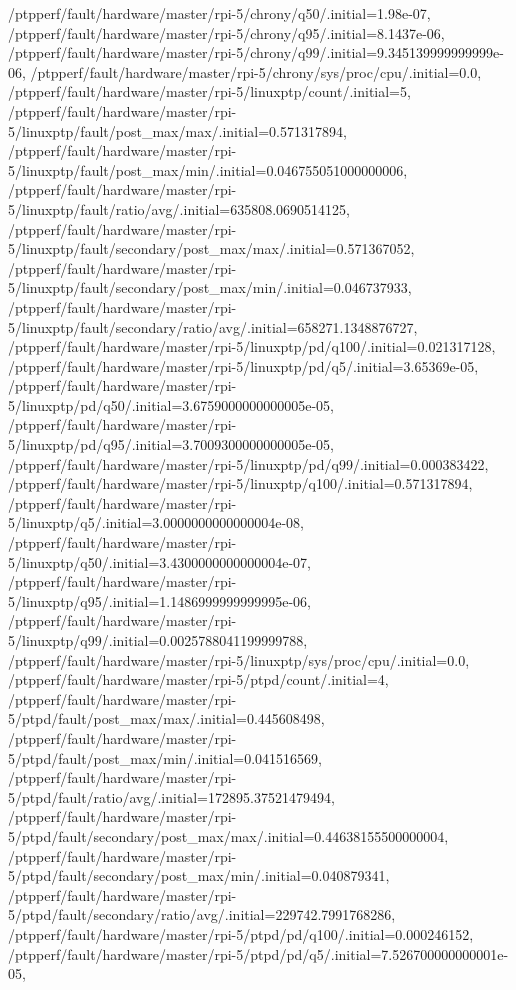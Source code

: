 {    /ptpperf/fault/hardware/master/rpi-5/chrony/q50/.initial=1.98e-07,
    /ptpperf/fault/hardware/master/rpi-5/chrony/q95/.initial=8.1437e-06,
    /ptpperf/fault/hardware/master/rpi-5/chrony/q99/.initial=9.345139999999999e-06,
    /ptpperf/fault/hardware/master/rpi-5/chrony/sys/proc/cpu/.initial=0.0,
    /ptpperf/fault/hardware/master/rpi-5/linuxptp/count/.initial=5,
    /ptpperf/fault/hardware/master/rpi-5/linuxptp/fault/post_max/max/.initial=0.571317894,
    /ptpperf/fault/hardware/master/rpi-5/linuxptp/fault/post_max/min/.initial=0.046755051000000006,
    /ptpperf/fault/hardware/master/rpi-5/linuxptp/fault/ratio/avg/.initial=635808.0690514125,
    /ptpperf/fault/hardware/master/rpi-5/linuxptp/fault/secondary/post_max/max/.initial=0.571367052,
    /ptpperf/fault/hardware/master/rpi-5/linuxptp/fault/secondary/post_max/min/.initial=0.046737933,
    /ptpperf/fault/hardware/master/rpi-5/linuxptp/fault/secondary/ratio/avg/.initial=658271.1348876727,
    /ptpperf/fault/hardware/master/rpi-5/linuxptp/pd/q100/.initial=0.021317128,
    /ptpperf/fault/hardware/master/rpi-5/linuxptp/pd/q5/.initial=3.65369e-05,
    /ptpperf/fault/hardware/master/rpi-5/linuxptp/pd/q50/.initial=3.6759000000000005e-05,
    /ptpperf/fault/hardware/master/rpi-5/linuxptp/pd/q95/.initial=3.7009300000000005e-05,
    /ptpperf/fault/hardware/master/rpi-5/linuxptp/pd/q99/.initial=0.000383422,
    /ptpperf/fault/hardware/master/rpi-5/linuxptp/q100/.initial=0.571317894,
    /ptpperf/fault/hardware/master/rpi-5/linuxptp/q5/.initial=3.0000000000000004e-08,
    /ptpperf/fault/hardware/master/rpi-5/linuxptp/q50/.initial=3.4300000000000004e-07,
    /ptpperf/fault/hardware/master/rpi-5/linuxptp/q95/.initial=1.1486999999999995e-06,
    /ptpperf/fault/hardware/master/rpi-5/linuxptp/q99/.initial=0.0025788041199999788,
    /ptpperf/fault/hardware/master/rpi-5/linuxptp/sys/proc/cpu/.initial=0.0,
    /ptpperf/fault/hardware/master/rpi-5/ptpd/count/.initial=4,
    /ptpperf/fault/hardware/master/rpi-5/ptpd/fault/post_max/max/.initial=0.445608498,
    /ptpperf/fault/hardware/master/rpi-5/ptpd/fault/post_max/min/.initial=0.041516569,
    /ptpperf/fault/hardware/master/rpi-5/ptpd/fault/ratio/avg/.initial=172895.37521479494,
    /ptpperf/fault/hardware/master/rpi-5/ptpd/fault/secondary/post_max/max/.initial=0.44638155500000004,
    /ptpperf/fault/hardware/master/rpi-5/ptpd/fault/secondary/post_max/min/.initial=0.040879341,
    /ptpperf/fault/hardware/master/rpi-5/ptpd/fault/secondary/ratio/avg/.initial=229742.7991768286,
    /ptpperf/fault/hardware/master/rpi-5/ptpd/pd/q100/.initial=0.000246152,
    /ptpperf/fault/hardware/master/rpi-5/ptpd/pd/q5/.initial=7.526700000000001e-05,
}
